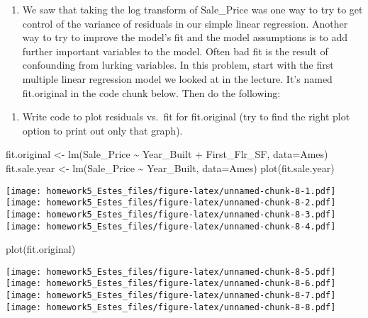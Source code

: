 \documentclass[
]{article}
\newenvironment{Shaded}{\begin{snugshade}}{\end{snugshade}}
\newcommand{\AttributeTok}[1]{\textcolor[rgb]{0.77,0.63,0.00}{#1}}
\newcommand{\FunctionTok}[1]{\textcolor[rgb]{0.00,0.00,0.00}{#1}}
\newcommand{\NormalTok}[1]{#1}
\newcommand{\OtherTok}[1]{\textcolor[rgb]{0.56,0.35,0.01}{#1}}
\newcommand{\SpecialCharTok}[1]{\textcolor[rgb]{0.00,0.00,0.00}{#1}}
\providecommand{\tightlist}{%
  \setlength{\itemsep}{0pt}\setlength{\parskip}{0pt}}
\begin{document}
\begin{enumerate}
\def\labelenumi{\arabic{enumi}.}
\setcounter{enumi}{3}
\tightlist
\item
  We saw that taking the log transform of Sale\_Price was one way to try
  to get control of the variance of residuals in our simple linear
  regression. Another way to try to improve the model's fit and the
  model assumptions is to add further important variables to the model.
  Often bad fit is the result of confounding from lurking variables. In
  this problem, start with the first multiple linear regression model we
  looked at in the lecture. It's named fit.original in the code chunk
  below. Then do the following:
\end{enumerate}

\begin{enumerate}
\def\labelenumi{\alph{enumi}.}
\tightlist
\item
  Write code to plot residuals vs.~fit for fit.original (try to find the
  right plot option to print out only that graph).
\end{enumerate}

\begin{Shaded}
\begin{Highlighting}[]
\NormalTok{fit.original }\OtherTok{\textless{}{-}} \FunctionTok{lm}\NormalTok{(Sale\_Price }\SpecialCharTok{\textasciitilde{}}\NormalTok{ Year\_Built }\SpecialCharTok{+}\NormalTok{ First\_Flr\_SF, }\AttributeTok{data=}\NormalTok{Ames)}
\NormalTok{fit.sale.year }\OtherTok{\textless{}{-}} \FunctionTok{lm}\NormalTok{(Sale\_Price }\SpecialCharTok{\textasciitilde{}}\NormalTok{ Year\_Built, }\AttributeTok{data=}\NormalTok{Ames)}
\FunctionTok{plot}\NormalTok{(fit.sale.year)}
\end{Highlighting}
\end{Shaded}

\texttt{[image: homework5\_Estes\_files/figure-latex/unnamed-chunk-8-1.pdf]}
\texttt{[image: homework5\_Estes\_files/figure-latex/unnamed-chunk-8-2.pdf]}
\texttt{[image: homework5\_Estes\_files/figure-latex/unnamed-chunk-8-3.pdf]}
\texttt{[image: homework5\_Estes\_files/figure-latex/unnamed-chunk-8-4.pdf]}

\begin{Shaded}
\begin{Highlighting}[]
\FunctionTok{plot}\NormalTok{(fit.original)}
\end{Highlighting}
\end{Shaded}

\texttt{[image: homework5\_Estes\_files/figure-latex/unnamed-chunk-8-5.pdf]}
\texttt{[image: homework5\_Estes\_files/figure-latex/unnamed-chunk-8-6.pdf]}
\texttt{[image: homework5\_Estes\_files/figure-latex/unnamed-chunk-8-7.pdf]}
\texttt{[image: homework5\_Estes\_files/figure-latex/unnamed-chunk-8-8.pdf]}
\end{document}
